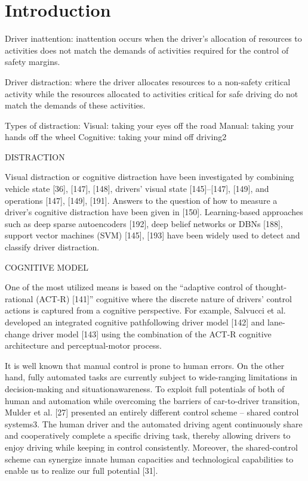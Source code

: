 \chapter{Introduction}
\label{sec:intro}

\iffalse

Driver   inattention: inattention  occurs  when  the  driver’s  allocation  of resources  to  activities  does not  match  the  demands  of  activities  required  for  the control of safety margins.

Driver distraction: where  the  driver  allocates  resources  to a  non-safety critical activity while the resources allocated to activities critical for safe driving do not match the demands of these activities.

Types of distraction:
    Visual: taking your eyes off the road
    Manual: taking your hands off the wheel
    Cognitive: taking your mind off driving2                             

DISTRACTION

Visual distraction or cognitive distraction have been investigated by combining vehicle state [36], [147], [148], drivers’ visual state [145]–[147], [149], and operations [147], [149], [191]. Answers to the question of how to measure a driver’s cognitive distraction have been given in [150]. Learning-based approaches such as deep sparse autoencoders [192], deep belief networks or DBNs [188], support vector machines (SVM) [145], [193] have been widely used to detect and classify driver distraction. \cite{shared_control}


COGNITIVE MODEL

One of the most utilized means is based on the “adaptive control of thought-rational (ACT-R) [141]”
cognitive where the discrete nature of drivers’ control actions is captured from a cognitive perspective. For example, Salvucci et al. developed an integrated cognitive pathfollowing driver model [142] and lane-change driver model [143] using the combination of the ACT-R cognitive architecture and perceptual-motor process. \cite{shared_control}



It is well known that manual control is prone to human errors. On the other hand, fully automated tasks are currently subject to wide-ranging limitations in decision-making and situationawareness. To exploit full potentials of both of human and automation while overcoming the barriers of car-to-driver transition, Mulder et al. [27] presented an entirely different control scheme – shared control systems3. The human driver and the automated driving agent continuously share and cooperatively complete a specific driving task, thereby allowing drivers to enjoy driving while keeping in control consistently. Moreover, the shared-control scheme can synergize innate human capacities and technological capabilities to enable us to realize our full potential [31].



